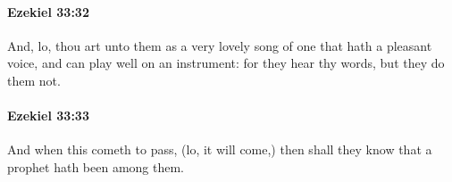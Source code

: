 		\paragraph{Ezekiel 33:32} %
			\label{EZEKIEL-33-32}

			And, lo, thou art unto them as a very lovely song of one that hath a pleasant voice, and can play well on an instrument: for they hear thy words, but they do them not.


		\paragraph{Ezekiel 33:33} %
			\label{EZEKIEL-33-33}

			And when this cometh to pass, (lo, it will come,) then shall they know that a prophet hath been among them.

